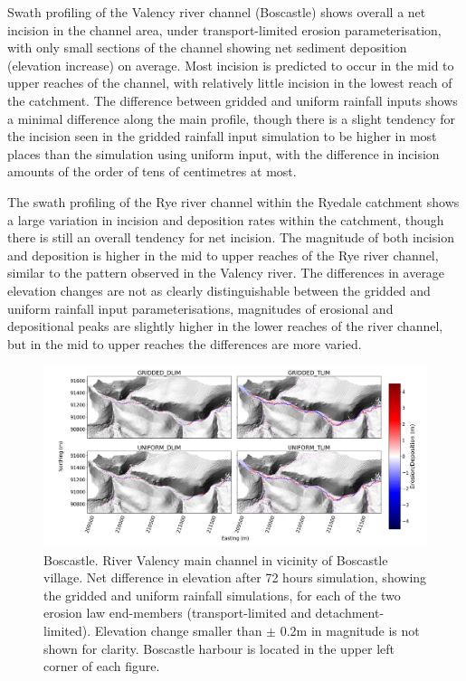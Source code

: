 Swath profiling of the Valency river channel (Boscastle) shows overall a net incision in the channel area, under transport-limited erosion parameterisation, with only small sections of the channel showing net sediment deposition (elevation increase) on average. Most incision is predicted to occur in the mid to upper reaches of the channel, with relatively little incision in the lowest reach of the catchment. The difference between gridded and uniform rainfall inputs shows a minimal difference along the main profile, though there is a slight tendency for the incision seen in the gridded rainfall input simulation to be higher in most places than the simulation using uniform input, with the difference in incision amounts of the order of tens of centimetres at most.

The swath profiling of the Rye river channel within the Ryedale catchment shows a large variation in incision and deposition rates within the catchment, though there is still an overall tendency for net incision. The magnitude of both incision and deposition is higher in the mid to upper reaches of the Rye river channel, similar to the pattern observed in the Valency river. The differences in average elevation changes are not as clearly distinguishable between the gridded and uniform rainfall input parameterisations, magnitudes of erosional and depositional peaks are slightly higher in the lower reaches of the river channel, but in the mid to upper reaches the differences are more varied. 
 
%
%

\begin{figure}
\includegraphics[width=25cm]{chp06_figures_scripts/figure_boscastle_erosion_diff_ensemble.png}
\caption{Boscastle. River Valency main channel in vicinity of Boscastle village. Net difference in elevation after 72 hours simulation, showing the gridded and uniform rainfall simulations, for each of the two erosion law end-members (transport-limited and detachment-limited). Elevation change smaller than \(\pm\) 0.2m in magnitude is not shown for clarity. Boscastle harbour is located in the upper left corner of each figure.}
\label{fig_boscastle_2dplan_erosion_ensemble}
\end{figure}

